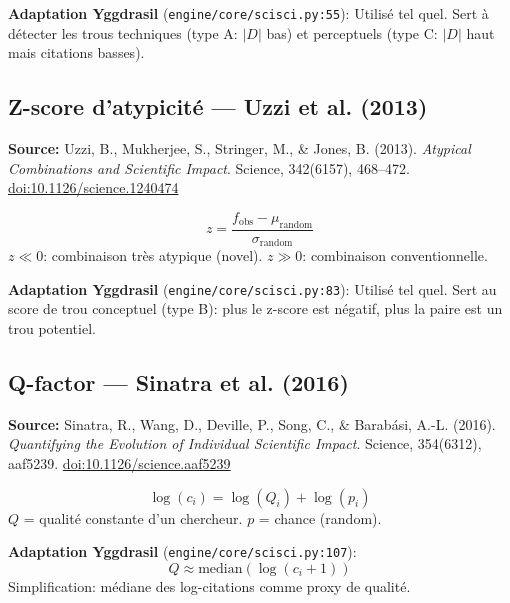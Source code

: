 \documentclass[11pt,a4paper]{article}
\begin{document}
\textbf{Adaptation Yggdrasil} (\texttt{engine/core/scisci.py:55}):
Utilis\'e tel quel. Sert \`a d\'etecter les trous techniques (type A: $|D|$ bas)
et perceptuels (type C: $|D|$ haut mais citations basses).

\subsection{Z-score d'atypicit\'e --- Uzzi et al. (2013)}

\textbf{Source:} Uzzi, B., Mukherjee, S., Stringer, M., \& Jones, B. (2013).
\textit{Atypical Combinations and Scientific Impact}.
Science, 342(6157), 468--472.
\href{https://doi.org/10.1126/science.1240474}{doi:10.1126/science.1240474}

\begin{equation}
z = \frac{f_{\text{obs}} - \mu_{\text{random}}}{\sigma_{\text{random}}}
\end{equation}
$z \ll 0$: combinaison tr\`es atypique (novel).
$z \gg 0$: combinaison conventionnelle.

\textbf{Adaptation Yggdrasil} (\texttt{engine/core/scisci.py:83}):
Utilis\'e tel quel. Sert au score de trou conceptuel (type B):
plus le z-score est n\'egatif, plus la paire est un trou potentiel.

\subsection{Q-factor --- Sinatra et al. (2016)}

\textbf{Source:} Sinatra, R., Wang, D., Deville, P., Song, C., \& Barab\'asi, A.-L. (2016).
\textit{Quantifying the Evolution of Individual Scientific Impact}.
Science, 354(6312), aaf5239.
\href{https://doi.org/10.1126/science.aaf5239}{doi:10.1126/science.aaf5239}

\begin{equation}
\log(c_i) = \log(Q_i) + \log(p_i)
\end{equation}
$Q$ = qualit\'e constante d'un chercheur. $p$ = chance (random).

\textbf{Adaptation Yggdrasil} (\texttt{engine/core/scisci.py:107}):
\begin{equation}
Q \approx \text{median}\!\left(\log(c_i + 1)\right)
\end{equation}
Simplification: m\'ediane des log-citations comme proxy de qualit\'e.
\end{document}
